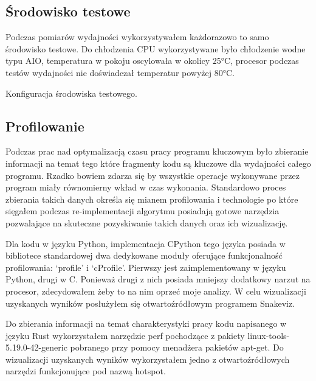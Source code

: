 \documentclass[11pt, a4paper]{article}
\begin{document}
\begin{sloppypar}
    \subsection{Środowisko testowe}
    Podczas pomiarów wydajności wykorzystywałem każdorazowo to samo środowisko testowe.
    Do chłodzenia CPU wykorzystywane było chłodzenie wodne typu AIO, temperatura w pokoju
    oscylowała w okolicy 25°C, procesor podczas testów wydajności nie doświadczał
    temperatur powyżej 80°C.

    \FloatBarrier
    \begin{table}[ht]
      \centering
      
      \caption{Konfiguracja środowiska testowego.}
      \label{pc-configuration}
    \end{table}
    \FloatBarrier

    \subsection{Profilowanie}
    Podczas prac nad optymalizacją czasu pracy programu kluczowym było zbieranie informacji
    na temat tego które fragmenty kodu są kluczowe dla wydajności całego programu.
    Rzadko bowiem zdarza się by wszystkie operacje wykonywane przez program miały
    równomierny wkład w czas wykonania. Standardowo proces zbierania takich danych określa
    się mianem profilowania i technologie po które sięgałem podczas re-implementacji algorytmu
    posiadają gotowe narzędzia pozwalające na skuteczne pozyskiwanie takich danych oraz ich
    wizualizację.

    Dla kodu w języku Python, implementacja CPython tego języka posiada w bibliotece
    standardowej dwa dedykowane moduły oferujące funkcjonalność profilowania: `profile' i
    `cProfile'. Pierwszy jest zaimplementowany w języku Python, drugi w C. Ponieważ
    drugi z nich posiada mniejszy dodatkowy narzut na procesor, zdecydowałem żeby to na nim
    oprzeć moje analizy. W celu wizualizacji uzyskanych wyników posłużyłem się
    otwartoźródłowym programem Snakeviz\cite{Snakeviz_PyPI}.

    Do zbierania informacji na temat charakterystyki pracy kodu napisanego w języku Rust
    wykorzystałem narzędzie perf pochodzące z pakiety linux-tools-5.19.0-42-generic
    pobranego przy pomocy menadżera pakietów apt-get. Do wizualizacji uzyskanych wyników
    wykorzystałem jedno z otwartoźródłowych narzędzi funkcjonujące pod nazwą hotspot\cite{HOTSPOT}.


\end{sloppypar}
\end{document}
